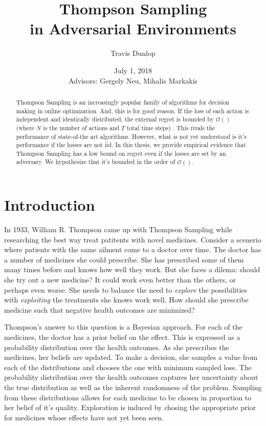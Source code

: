 \documentclass[10pt,a4paper]{article} %
\begin{document}
	\pagestyle{plain}
	\title{\rmfamily\normalfont Thompson Sampling \\in Adversarial Environments}
	\author{Travis Dunlop }
	\date{July 1, 2018\\ $\,$ 
			 \\Advisors: Gergely Neu, Mihalis Markakis} 
	
	\maketitle
	
	\begin{abstract}
		Thompson Sampling is an increasingly popular family of algorithms for decision making in online optimization.  And, this is for good reason.  If the loss of each action is independent and identically distributed, the external regret is bounded by $\mathcal{O}()$ (where $N$ is the number of actions and $T$ total time steps) \cite{}. This rivals the performance of state-of-the art algorithms.  However, what is not yet understood is it's performance if the losses are not iid.  In this thesis, we provide empirical evidence that Thompson Sampling has a low bound on regret even if the losses are set by an adversary.  We hypothesize that it's bounded in the order of $\mathcal{O}()$.
	
	\end{abstract}
	
	\section{Introduction}
	
	In 1933, William R. Thompson came up with Thompson Sampling \cite{} while researching the best way treat patitents with novel medicines.  Consider a scenerio where patients with the same ailment come to a doctor over time.  The doctor has a number of medicines she could prescribe.  She has prescribed some of them many times before and knows how well they work.  But she faces a dilema: should she try out a new medicine? It could work even better than the others, or perhaps even worse.  She needs to balance the need to \textit{explore} the possibilities with \textit{exploiting} the treatments she knows work well.  How should she prescribe medicine such that negative health outcomes are minimized?
	
	Thompson's answer to this question is a Bayesian approach.  For each of the medicines, the doctor has a prior belief on the effect.  This is expressed as a probability distribution over the health outcomes.  As she prescribes the medicines, her beliefs are updated.  To make a decision, she samples a value from each of the distributions and chooses the one with minimum sampled loss.  The probability distribution over the health outcomes captures her uncertainty about the true distribution as well as the inherent randomness of the problem.  Sampling from these distributions allows for each medicine to be chosen in proportion to her belief of it's quality.  Exploration is induced by chosing the appropriate prior for medicines whose effects have not yet been seen.
	
\end{document}
